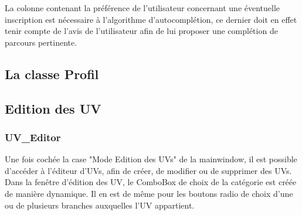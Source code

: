 \documentclass[a4paper,10pt,french]{report}
\begin{document}
	La colonne contenant la préférence de l'utilisateur concernant une éventuelle inscription est nécessaire à l'algorithme d'autocomplétion, ce dernier doit en effet tenir compte de l'avis de l'utilisateur afin de lui proposer une complétion de parcours pertinente.
	
	\subsection{La classe Profil}\label{subsec:Profil}
		
	
	
		\subsubsection{}

	\subsection{Edition des UV}\label{subsec:IC}
		\subsubsection{UV\_Editor}
		Une fois cochée la case "Mode Edition des UVs" de la mainwindow, il est possible d'accéder à l'éditeur d'UVs, afin de créer, de modifier ou de supprimer des UVs.\\
		Dans la fenêtre d'édition des UV, le ComboBox de choix de la catégorie est créée de manière dynamique.
		Il en est de même pour les boutons radio de choix d'une ou de plusieurs branches auxquelles l'UV appartient.
		
		
		
		
		
			\paragraph{}
			\paragraph{}
			\paragraph{}
		\subsubsection{}
			\paragraph{}
\end{document}
